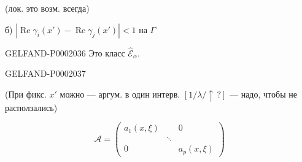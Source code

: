 (лок. это возм. всегда)



б) $|\operatorname{Re}\gamma_i(x')-\operatorname{Re}\gamma_j(x')|<1$ на $\Gamma$



\begin{GelfandAdjacentEvidence}{GELFAND-P000203}{6}
Это класс $\widehat{\mathcal E}_\alpha$.
\end{GelfandAdjacentEvidence}
\begin{GelfandAdjacentEvidence}{GELFAND-P000203}{7}

(При фикс. $x'$ можно --- аргум. в один интерв. $[1/\lambda/\uparrow\,?]$ --- надо, чтобы не расползались)



\end{GelfandAdjacentEvidence}

\begin{equation*}\mathcal A=\begin{pmatrix}a_1(x,\xi)&&0\\&\ddots&\\0&&a_p(x,\xi)\end{pmatrix}\end{equation*}





\begin{flushright}\end{flushright}




